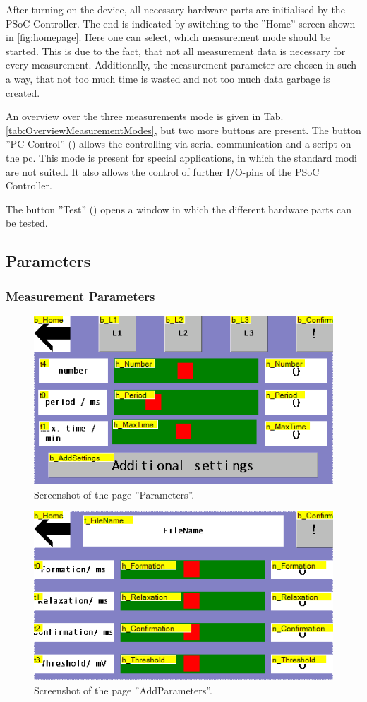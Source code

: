 	After turning on the device, all necessary hardware parts are initialised by the PSoC Controller. The end is indicated by switching to the ''Home'' screen shown in \ref{fig:homepage}.
	Here one can select, which measurement mode should be started. This is due to the fact, that not all measurement data is necessary for every measurement. 
	Additionally, the measurement parameter are chosen in such a way, that not too much time is wasted and not too much data garbage is created.
	
	An overview over the three measurements mode is given in Tab. \ref{tab:OverviewMeasurementModes}, but two more buttons are present. 
	The button ''PC-Control'' () allows the controlling via serial communication and a script on the pc. This mode is present for special applications, in which the standard modi are not suited. It also allows the control of further I/O-pins of the PSoC Controller. 
	
	The button ''Test'' () opens a window in which the different hardware parts can be tested. 
	
	\subsection{Parameters}
	
	\subsubsection{Measurement Parameters}
	\begin{figure}[h]
		\centering
		\includegraphics[width=0.7\linewidth]{LamellaDevice_Hardware/ParametersPage}
		\caption{Screenshot of the page ''Parameters''.}
		\label{fig:parameterspage}
	\end{figure}
	
	\begin{figure}[h]
		\centering
		\includegraphics[width=0.7\linewidth]{LamellaDevice_Hardware/AddParametersPage}
		\caption{Screenshot of the page ''AddParameters''.}
		\label{fig:addsettingpage}
	\end{figure}



